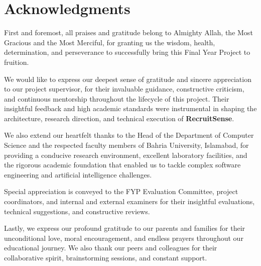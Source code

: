 \chapter*{Acknowledgments}

First and foremost, all praises and gratitude belong to Almighty Allah, the Most Gracious and the Most Merciful, for granting us the wisdom, health, determination, and perseverance to successfully bring this Final Year Project to fruition.

We would like to express our deepest sense of gratitude and sincere appreciation to our project supervisor, for their invaluable guidance, constructive criticism, and continuous mentorship throughout the lifecycle of this project. Their insightful feedback and high academic standards were instrumental in shaping the architecture, research direction, and technical execution of \textbf{RecruitSense}.

We also extend our heartfelt thanks to the Head of the Department of Computer Science and the respected faculty members of Bahria University, Islamabad, for providing a conducive research environment, excellent laboratory facilities, and the rigorous academic foundation that enabled us to tackle complex software engineering and artificial intelligence challenges.

Special appreciation is conveyed to the FYP Evaluation Committee, project coordinators, and internal and external examiners for their insightful evaluations, technical suggestions, and constructive reviews.

Lastly, we express our profound gratitude to our parents and families for their unconditional love, moral encouragement, and endless prayers throughout our educational journey. We also thank our peers and colleagues for their collaborative spirit, brainstorming sessions, and constant support.

\vspace{12mm}


\vspace{4mm}
\flushleft{\today}